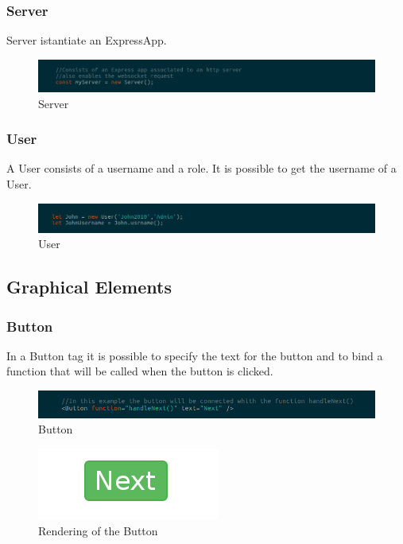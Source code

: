 \subsubsection{Server}
Server istantiate an ExpressApp.
\begin{figure}[H]
	\centering
	\includegraphics[width=14cm]{../../documenti/UserManualFramework/framework_model/Server.png}
	\caption{Server}
\end{figure}

\subsubsection{User}
A User consists of a username and a role. It is possible to get the username of a User.
\begin{figure}[H]
	\centering
	\includegraphics[width=14cm]{../../documenti/UserManualFramework/framework_model/User.png}
	\caption{User}
\end{figure}

\subsection{Graphical Elements}
\subsubsection{Button}
In a Button tag it is possible to specify the text for the button and to bind a function that will be called when the button is clicked.
\begin{figure}[H]
	\centering
	\includegraphics[width=14cm]{../../documenti/UserManualFramework/framework_view/11framework_view_button.png}
	\caption{Button}
\end{figure}

\begin{figure}[H]
	\centering
	\includegraphics[width=6cm]{../../documenti/UserManualFramework/graphical_elements/buttonGE.png}
	\caption{Rendering of the Button}
\end{figure}

